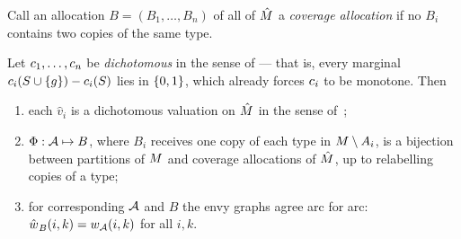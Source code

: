 Call an allocation $B = (B_1,\dots,B_n)$ of all of $\hat{M}$ a
\emph{coverage allocation} if no $B_i$ contains two copies of the same type.

\begin{theorem}
\label{thm:replica}
Let $c_1,\dots,c_n$ be \emph{dichotomous} in the sense of
 --- that is, every marginal
$c_i(S \cup \left\{g\right\}) - c_i(S)$ lies in $\left\{0,1\right\}$, which already forces
$c_i$ to be monotone. Then
\begin{enumerate}
  \item[(i)] each $\hat{v}_i$ is a dichotomous valuation on $\hat{M}$ in
    the sense of~\cite{BKNS22};
  \item[(ii)] $\Phi : \mathcal{A} \mapsto B$, where $B_i$ receives one copy of each
    type in $M \setminus A_{i}$, is a bijection between partitions of
    $M$ and coverage allocations of $\hat{M}$, up to relabelling
    copies of a type;
  \item[(iii)] for corresponding $\mathcal{A}$ and $B$ the envy graphs agree arc for
    arc: $\hat{w_{}}_B(i,k) = w_{\mathcal{A}}(i,k)$ for all $i,k$.
\end{enumerate}
\end{theorem}

